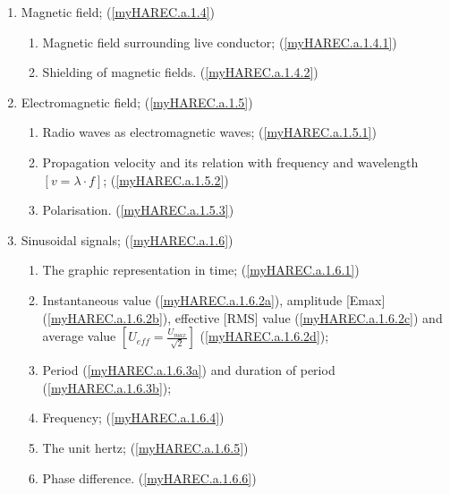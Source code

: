 \begin{enumerate}
\begin{enumerate}[noitemsep]
\item Magnetic field; (\ref{myHAREC.a.1.4})\label{HAREC.a.1.4}
\begin{enumerate}[noitemsep]
\item Magnetic field surrounding live conductor; (\ref{myHAREC.a.1.4.1})\label{HAREC.a.1.4.1}
\item Shielding of magnetic fields. (\ref{myHAREC.a.1.4.2})\label{HAREC.a.1.4.2}
\end{enumerate}

\item Electromagnetic field; (\ref{myHAREC.a.1.5})\label{HAREC.a.1.5}
\begin{enumerate}[noitemsep]
\item Radio waves as electromagnetic waves; (\ref{myHAREC.a.1.5.1})\label{HAREC.a.1.5.1}
\item Propagation velocity and its relation with frequency and wavelength \(\left[v = \lambda \cdot f\right]\); (\ref{myHAREC.a.1.5.2})\label{HAREC.a.1.5.2}
\item Polarisation. (\ref{myHAREC.a.1.5.3})\label{HAREC.a.1.5.3}
\end{enumerate}

\item Sinusoidal signals; (\ref{myHAREC.a.1.6})\label{HAREC.a.1.6}
\begin{enumerate}[noitemsep]
\item The graphic representation in time; (\ref{myHAREC.a.1.6.1})\label{HAREC.a.1.6.1}
\item Instantaneous value (\ref{myHAREC.a.1.6.2a})\label{HAREC.a.1.6.2a}, amplitude [Emax] (\ref{myHAREC.a.1.6.2b})\label{HAREC.a.1.6.2b}, effective [RMS] value (\ref{myHAREC.a.1.6.2c})\label{HAREC.a.1.6.2c} and average value \(\left[U_{eff} = \frac{U_{max}}{\sqrt{2}}\right]\) (\ref{myHAREC.a.1.6.2d})\label{HAREC.a.1.6.2d};
\item Period (\ref{myHAREC.a.1.6.3a})\label{HAREC.a.1.6.3a} and duration of period (\ref{myHAREC.a.1.6.3b})\label{HAREC.a.1.6.3b};
\item Frequency; (\ref{myHAREC.a.1.6.4})\label{HAREC.a.1.6.4}
\item The unit hertz; (\ref{myHAREC.a.1.6.5})\label{HAREC.a.1.6.5}
\item Phase difference. (\ref{myHAREC.a.1.6.6})\label{HAREC.a.1.6.6}
\end{enumerate}


\end{enumerate}
\end{enumerate}
